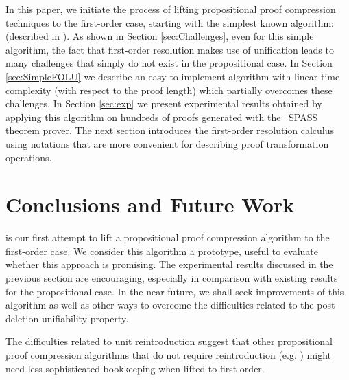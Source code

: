 \documentclass{llncs}
\begin{document}
In this paper, we initiate the process of lifting propositional proof compression techniques to the first-order case, starting with the simplest known algorithm: {\LowerUnits} (described in \cite{LURPI}). 
As shown in Section \ref{sec:Challenges}, even for this simple algorithm, the fact that first-order resolution makes use of unification leads to many challenges that simply do not exist in the propositional case. 
In Section \ref{sec:SimpleFOLU} we describe an easy to implement algorithm with  linear time complexity (with respect to the proof length) which partially overcomes these challenges. 
In Section \ref{sec:exp} we present experimental results obtained by applying this algorithm on hundreds of proofs generated with the{\
SPASS} theorem prover. 
The next section introduces the first-order resolution calculus using notations that are more convenient for describing proof transformation operations.








\vspace{-0.25cm}



\vspace{-0.35cm}
\section{Conclusions and Future Work}
\vspace{-0.2cm}

{\SFOLowerUnits} is our first attempt to lift a propositional proof compression algorithm to the first-order case. We consider this algorithm a prototype, useful to evaluate whether this approach is promising. The experimental results discussed in the previous section are encouraging, especially in comparison with existing results for the propositional case. In the near future, we shall seek improvements of this algorithm as well as other ways to overcome the difficulties related to the post-deletion unifiability property. 

The difficulties related to unit reintroduction suggest that other propositional proof compression algorithms that do not require reintroduction (e.g. {\RecyclePivotsIntersection} \cite{LURPI}) might need less sophisticated bookkeeping when lifted to first-order.
\end{document}
